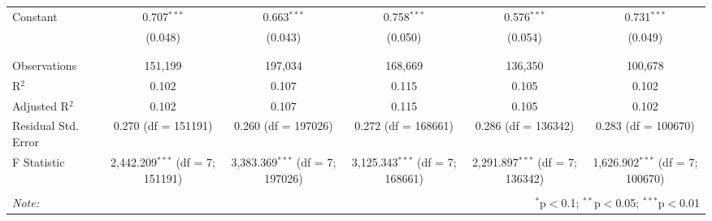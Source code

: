 \begin{table}[!htbp]
\begin{tabular}{@{\extracolsep{5pt}}lccccc}
 Constant & 0.707$^{***}$ & 0.663$^{***}$ & 0.758$^{***}$ & 0.576$^{***}$ & 0.731$^{***}$ \\ 
  & (0.048) & (0.043) & (0.050) & (0.054) & (0.049) \\ 
  & & & & & \\ 
\hline \\[-1.8ex] 
Observations & 151,199 & 197,034 & 168,669 & 136,350 & 100,678 \\ 
R$^{2}$ & 0.102 & 0.107 & 0.115 & 0.105 & 0.102 \\ 
Adjusted R$^{2}$ & 0.102 & 0.107 & 0.115 & 0.105 & 0.102 \\ 
Residual Std. Error & 0.270 (df = 151191) & 0.260 (df = 197026) & 0.272 (df = 168661) & 0.286 (df = 136342) & 0.283 (df = 100670) \\ 
F Statistic & 2,442.209$^{***}$ (df = 7; 151191) & 3,383.369$^{***}$ (df = 7; 197026) & 3,125.343$^{***}$ (df = 7; 168661) & 2,291.897$^{***}$ (df = 7; 136342) & 1,626.902$^{***}$ (df = 7; 100670) \\ 
\hline 
\hline \\[-1.8ex] 
\textit{Note:}  & \multicolumn{5}{r}{$^{*}$p$<$0.1; $^{**}$p$<$0.05; $^{***}$p$<$0.01} \\ 
\end{tabular} 
\end{table} 
